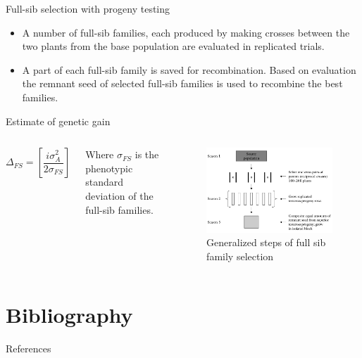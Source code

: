 \documentclass[11pt,ignorenonframetext,aspectratio=169]{beamer}
\newif\ifbibliography
\providecommand{\tightlist}{%
  \setlength{\itemsep}{0pt}\setlength{\parskip}{0pt}}
\newcommand{\bcolumns}{\begin{columns}[T, onlytextwidth]}
\newcommand{\ecolumns}{\end{columns}}
\begin{document}
\begin{frame}{Full-sib selection with progeny testing}
\protect\hypertarget{full-sib-selection-with-progeny-testing}{}
\begin{itemize}
\tightlist
\item
  A number of full-sib families, each produced by making crosses between
  the two plants from the base population are evaluated in replicated
  trials.
\item
  A part of each full-sib family is saved for recombination. Based on
  evaluation the remnant seed of selected full-sib families is used to
  recombine the best families.
\end{itemize}
\end{frame}

\begin{frame}{Estimate of genetic gain}
\protect\hypertarget{estimate-of-genetic-gain}{}
\bcolumns
{}

\[
\Delta_{FS} = \left[\frac{i \sigma^2_A}{2 \sigma_{FS}}\right]
\]

Where \(\sigma_{FS}\) is the phenotypic standard deviation of the
full-sib families.


\begin{figure}

{\centering \includegraphics[width=0.88\linewidth]{./images/full_sib_selection} 

}

\caption{Generalized steps of full sib family selection}\label{fig:full-sib-selection}
\end{figure}

\ecolumns
\end{frame}

\hypertarget{bibliography}{%
\section{Bibliography}\label{bibliography}}

\begin{frame}{References}
\protect\hypertarget{references}{}
\end{frame}

          \begin{frame}[allowframebreaks]{}
    \bibliographytrue
    
    \end{frame}
  
\end{document}
